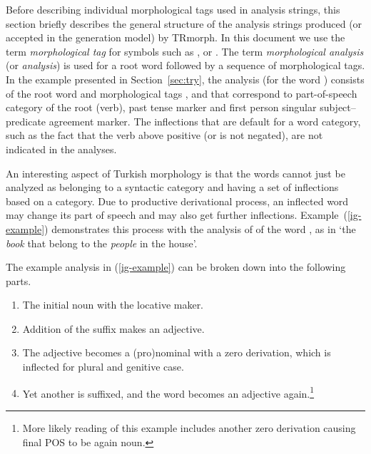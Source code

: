 \documentclass[twocolumn]{article}
\begin{document}
Before describing individual morphological tags used in analysis strings, 
this section briefly describes the general structure of the analysis strings
produced (or accepted in the generation model) by TRmorph.
In this document we use the term \emph{morphological tag} for symbols such as , or .
The term \emph{morphological analysis} (or \emph{analysis}) is used for a root word followed by a sequence of morphological tags. 
In the example presented in Section~\ref{sec:try}, 
the analysis  (for the word ) consists of the root word  
and morphological tags ,  and  
that correspond to part-of-speech category of the root (verb), past tense marker
and first person singular subject--predicate agreement marker.
The inflections that are default for a word category, 
such as the fact that the verb above positive (or is not negated), 
are not indicated in the analyses.

An interesting aspect of Turkish morphology is that 
the words cannot just be analyzed as belonging to a syntactic category and having a set of inflections based on a category.
Due to productive derivational process, 
an inflected word may change its part of speech and may also get further inflections.
Example~(\ref{ig-example}) demonstrates this process with the analysis of of the word , as in `the \emph{book} that belong to the \emph{people} in the house'.


The example analysis in (\ref{ig-example}) can be broken down into the following parts.

\begin{enumerate}
\item The initial noun  with the locative maker.
\item Addition of the suffix  makes an adjective.
\item The adjective becomes a (pro)nominal with a zero derivation,
which is inflected for plural and genitive case.
\item Yet another  is suffixed, and the word becomes an
adjective again.\footnote{More likely reading of this example
includes another zero derivation causing final POS to be again noun.}
\end{enumerate}
\end{document}
